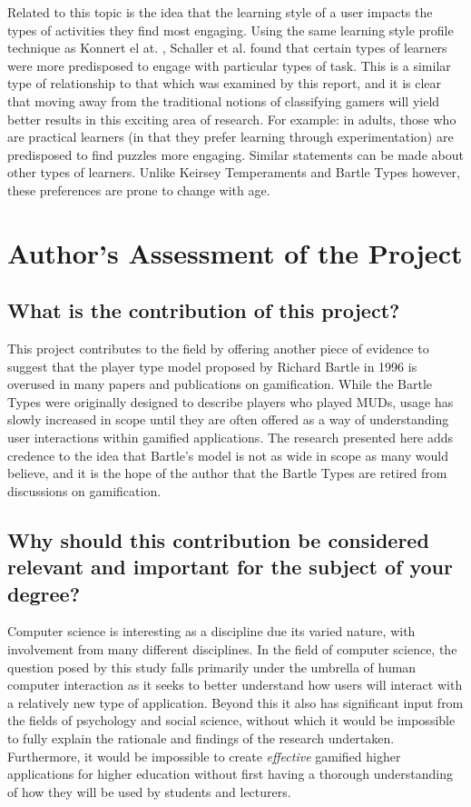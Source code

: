 \documentclass[12pt,a4paper,twoside]{report}
\begin{document}
Related to this topic is the idea that the learning style of a user impacts the types of activities they find most engaging. Using the same learning style profile technique as Konnert el at. \cite{konertmodeling}, Schaller et al. \cite{one-size} found that certain types of learners were more predisposed to engage with particular types of task. This is a similar type of relationship to that which was examined by this report, and it is clear that moving away from the traditional notions of classifying gamers will yield better results in this exciting area of research. For example: in adults, those who are practical learners (in that they prefer learning through experimentation) are predisposed to find puzzles more engaging. Similar statements can be made about other types of learners. Unlike Keirsey Temperaments and Bartle Types however, these preferences are prone to change with age.

\chapter{Author's Assessment of the Project}
\label{sec:issues}

\section{What is the contribution of this project?}
This project contributes to the field by offering another piece of evidence to suggest that the player type model proposed by Richard Bartle in 1996 is overused in many papers and publications on gamification. While the Bartle Types were originally designed to describe players who played MUDs, usage has slowly increased in scope until they are often offered as a way of understanding user interactions within gamified applications. The research presented here adds credence to the idea that Bartle's model is not as wide in scope as many would believe, and it is the hope of the author that the Bartle Types are retired from discussions on gamification.

\section{Why should this contribution be considered relevant and important for the subject of your degree?}
Computer science is interesting as a discipline due its varied nature, with involvement from many different disciplines. In the field of computer science, the question posed by this study falls primarily under the umbrella of human computer interaction as it seeks to better understand how users will interact with a relatively new type of application. Beyond this it also has significant input from the fields of psychology and social science, without which it would be impossible to fully explain the rationale and findings of the research undertaken. Furthermore, it would be impossible to create \textit{effective} gamified higher applications for higher education without first having a thorough understanding of how they will be used by students and lecturers.
\end{document}

